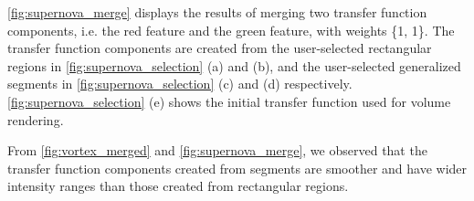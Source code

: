 \documentclass[twoside,twocolumn,10pt]{article}
\begin{document}


\autoref{fig:supernova_merge} displays the results of merging two transfer function components, i.e. the red feature and the green feature, with weights \{1, 1\}. The transfer function components are created from the user-selected rectangular regions in \autoref{fig:supernova_selection} (a) and (b), and the user-selected generalized segments in \autoref{fig:supernova_selection} (c) and (d) respectively. \autoref{fig:supernova_selection} (e) shows the initial transfer function used for volume rendering.

From \autoref{fig:vortex_merged} and \autoref{fig:supernova_merge}, we observed that the transfer function components created from segments are smoother and have wider intensity ranges than those created from rectangular regions.
\end{document}
